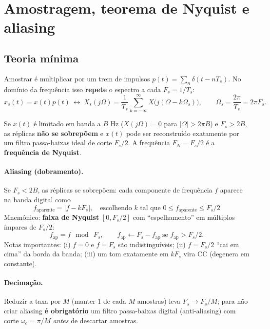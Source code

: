 \section{Amostragem, teorema de Nyquist e aliasing}\label{sec:amostragem}

\subsection*{Teoria mínima}

Amostrar é multiplicar por um trem de impulsos
$p(t)=\sum_n\delta(t-nT_s)$. No domínio da frequência isso \textbf{repete} o
espectro a cada $F_s=1/T_s$:
\[
  x_s(t)=x(t)p(t)\ \longleftrightarrow\
  X_s(j\Omega)=\frac{1}{T_s}\sum_{k=-\infty}^{\infty}
  X\bigl(j(\Omega-k\Omega_s)\bigr),\qquad \Omega_s=\frac{2\pi}{T_s}=2\pi F_s .
\]

\begin{teo}
Se $x(t)$ é limitado em banda a $B$ Hz ($X(j\Omega)=0$ para $|\Omega|>2\pi B$)
e $F_s>2B$, as réplicas \textbf{não se sobrepõem} e $x(t)$ pode ser
reconstruído exatamente por um filtro passa-baixas ideal de corte $F_s/2$. A
frequência $F_N=F_s/2$ é a \textbf{frequência de Nyquist}.
\end{teo}

\paragraph{Aliasing (dobramento).} Se $F_s<2B$, as réplicas se sobrepõem: cada
componente de frequência $f$ aparece na banda digital como
\[
  \boxed{\ f_{\text{aparente}}=\bigl|f-kF_s\bigr|,\quad
  \text{escolhendo }k\text{ tal que }0\le f_{\text{aparente}}\le F_s/2\ }
\]
Mnemônico: \textbf{faixa de Nyquist} $[0,F_s/2]$ com ``espelhamento'' em
múltiplos ímpares de $F_s/2$:
\[
  f_{\text{ap}}=f\ \bmod\ F_s,\qquad
  f_{\text{ap}}\leftarrow F_s-f_{\text{ap}}\ \text{se }f_{\text{ap}}>F_s/2 .
\]
Notas importantes: (i) $f=0$ e $f=F_s$ são indistinguíveis; (ii) $f=F_s/2$
``cai em cima'' da borda da banda; (iii) um tom exatamente em $kF_s$ vira
CC (degenera em constante).

\paragraph{Decimação.} Reduzir a taxa por $M$ (manter 1 de cada $M$ amostras)
leva $F_s\to F_s/M$; para não criar aliasing \textbf{é obrigatório} um filtro
passa-baixas digital (anti-aliasing) com corte $\omega_c=\pi/M$ \emph{antes} de
descartar amostras.

